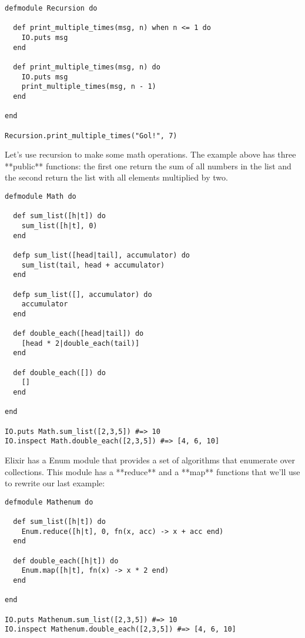 \begin{lstlisting}[label=errrr,caption=Elixir recursion]
defmodule Recursion do

  def print_multiple_times(msg, n) when n <= 1 do
    IO.puts msg
  end

  def print_multiple_times(msg, n) do
    IO.puts msg
    print_multiple_times(msg, n - 1)
  end

end

Recursion.print_multiple_times("Gol!", 7)
\end{lstlisting}

Let's use recursion to make some math operations. The example above has three
**public** functions: the first one return the sum of all numbers in the list
and the second return the list with all elements multiplied by two.

\begin{lstlisting}[label=elists,caption=Elixir recursion with lists]
defmodule Math do

  def sum_list([h|t]) do
    sum_list([h|t], 0)
  end

  defp sum_list([head|tail], accumulator) do
    sum_list(tail, head + accumulator)
  end

  defp sum_list([], accumulator) do
    accumulator
  end

  def double_each([head|tail]) do
    [head * 2|double_each(tail)]
  end

  def double_each([]) do
    []
  end

end

IO.puts Math.sum_list([2,3,5]) #=> 10
IO.inspect Math.double_each([2,3,5]) #=> [4, 6, 10]
\end{lstlisting}

Elixir has a Enum \cite{5_15} module that
provides a set of algorithms that enumerate over collections. This module has a
**reduce** and a **map** functions that we'll use to rewrite our last example:

\begin{lstlisting}[label=eenum,caption=Elixir lists with Enum]
defmodule Mathenum do

  def sum_list([h|t]) do
    Enum.reduce([h|t], 0, fn(x, acc) -> x + acc end)
  end

  def double_each([h|t]) do
    Enum.map([h|t], fn(x) -> x * 2 end)
  end

end

IO.puts Mathenum.sum_list([2,3,5]) #=> 10
IO.inspect Mathenum.double_each([2,3,5]) #=> [4, 6, 10]
\end{lstlisting}
